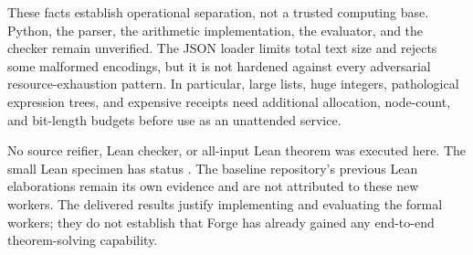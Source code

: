 These facts establish operational separation, not a trusted computing base.
Python, the parser, the arithmetic implementation, the evaluator, and the
checker remain unverified. The JSON loader limits total text size and rejects
some malformed encodings, but it is not hardened against every adversarial
resource-exhaustion pattern. In particular, large lists, huge integers,
pathological expression trees, and expensive receipts need additional
allocation, node-count, and bit-length budgets before use as an unattended
service.

No source reifier, Lean checker, or all-input Lean theorem was executed here.
The small Lean specimen has status . The baseline repository's
previous Lean elaborations remain its own evidence and are not attributed to
these new workers. The delivered results justify implementing and evaluating
the formal workers; they do not establish that Forge has already gained any
end-to-end theorem-solving capability.

